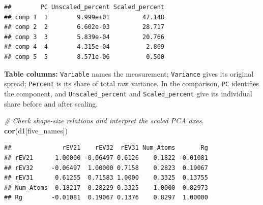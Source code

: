 \documentclass[
  10pt,
]{article}
\newenvironment{Shaded}{\begin{snugshade}}{\end{snugshade}}
\newcommand{\AttributeTok}[1]{\textcolor[rgb]{0.13,0.29,0.53}{#1}}
\newcommand{\CommentTok}[1]{\textcolor[rgb]{0.56,0.35,0.01}{\textit{#1}}}
\newcommand{\DecValTok}[1]{\textcolor[rgb]{0.00,0.00,0.81}{#1}}
\newcommand{\FunctionTok}[1]{\textcolor[rgb]{0.13,0.29,0.53}{\textbf{#1}}}
\newcommand{\NormalTok}[1]{#1}
\newcommand{\SpecialCharTok}[1]{\textcolor[rgb]{0.81,0.36,0.00}{\textbf{#1}}}
\begin{document}
\begin{Shaded}
\end{Shaded}

\begin{verbatim}
##        PC Unscaled_percent Scaled_percent
## comp 1  1        9.999e+01         47.148
## comp 2  2        6.602e-03         28.717
## comp 3  3        5.839e-04         20.766
## comp 4  4        4.315e-04          2.869
## comp 5  5        8.571e-06          0.500
\end{verbatim}

\textbf{Table columns:} \texttt{Variable} names the measurement;
\texttt{Variance} gives its original spread; \texttt{Percent} is its
share of total raw variance. In the comparison, \texttt{PC} identifies
the component, and \texttt{Unscaled\_percent} and
\texttt{Scaled\_percent} give its individual share before and after
scaling.

\begin{Shaded}
\begin{Highlighting}[]
\CommentTok{\# Check shape{-}size relations and interpret the scaled PCA axes.}
\FunctionTok{cor}\NormalTok{(d1[five\_names])}
\end{Highlighting}
\end{Shaded}

\begin{verbatim}
##              rEV21    rEV32  rEV31 Num_Atoms       Rg
## rEV21      1.00000 -0.06497 0.6126    0.1822 -0.01081
## rEV32     -0.06497  1.00000 0.7158    0.2823  0.19067
## rEV31      0.61255  0.71583 1.0000    0.3325  0.13755
## Num_Atoms  0.18217  0.28229 0.3325    1.0000  0.82973
## Rg        -0.01081  0.19067 0.1376    0.8297  1.00000
\end{verbatim}

\begin{Shaded}
\end{Shaded}
\end{document}
